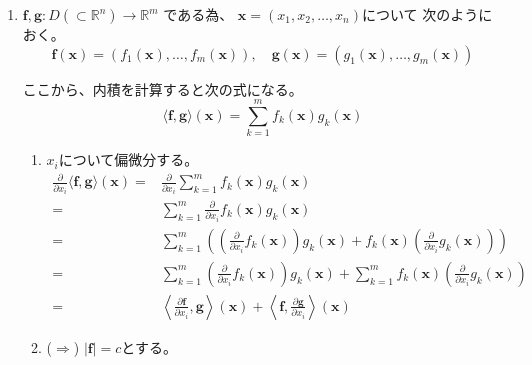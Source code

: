 \documentclass[12pt,b5paper]{ltjsarticle}
\begin{document}
\hrulefill

\begin{enumerate}
 \item
      $\bm{f},\bm{g} : D (\subset\mathbb{R}^n) \rightarrow \mathbb{R}^m$
      である為、
      $\bm{x}=(x_1,x_2,\dots,x_n)$について
      次のようにおく。
      \begin{equation}
       \bm{f}(\bm{x})=(f_1(\bm{x}),\dots,f_m(\bm{x})),
        \quad
      \bm{g}(\bm{x})=(g_1(\bm{x}),\dots,g_m(\bm{x}))
      \end{equation}

      ここから、内積を計算すると次の式になる。
      \begin{equation}
       \langle \bm{f},\bm{g}\rangle(\bm{x}) = \sum_{k=1}^{m}f_k(\bm{x})g_k(\bm{x})
      \end{equation}

      \begin{enumerate}
       \item
            $x_i$について偏微分する。
            \begin{align}
             \frac{\partial}{\partial x_i}\langle \bm{f},\bm{g}\rangle(\bm{x})
             =& \frac{\partial}{\partial x_i}\sum_{k=1}^{m}f_k(\bm{x})g_k(\bm{x})\\
             =& \sum_{k=1}^{m}\frac{\partial}{\partial x_i}f_k(\bm{x})g_k(\bm{x})\\
             =& \sum_{k=1}^{m}\left(\left(
             \frac{\partial}{\partial x_i}f_k(\bm{x})\right)g_k(\bm{x})
             + f_k(\bm{x})\left(\frac{\partial}{\partial x_i}g_k(\bm{x})
             \right)\right)\\
             =& \sum_{k=1}^{m}\left(
             \frac{\partial}{\partial x_i}f_k(\bm{x})\right)g_k(\bm{x})
             + \sum_{k=1}^{m}f_k(\bm{x})\left(\frac{\partial}{\partial x_i}g_k(\bm{x})
             \right)\\
             =& \left\langle \frac{\partial \bm{f}}{\partial x_i},\bm{g}\right\rangle(\bm{x})
             + \left\langle \bm{f},\frac{\partial \bm{g}}{\partial x_i}\right\rangle(\bm{x})
            \end{align}
       \item
            ($\Rightarrow$)
            $\lvert \bm{f} \rvert = c$とする。


\end{enumerate}
\end{enumerate}
\end{document}
